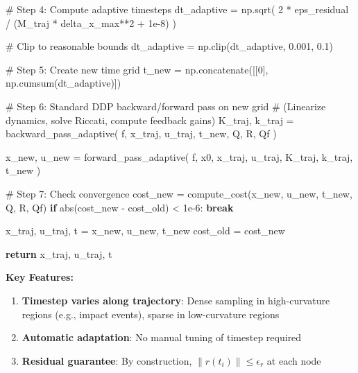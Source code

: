 \documentclass[
  letterpaper,
  DIV=11,
  numbers=noendperiod]{scrartcl}
\newenvironment{Shaded}{\begin{snugshade}}{\end{snugshade}}
\newcommand{\BuiltInTok}[1]{\textcolor[rgb]{0.00,0.23,0.31}{#1}}
\newcommand{\CommentTok}[1]{\textcolor[rgb]{0.37,0.37,0.37}{#1}}
\newcommand{\ControlFlowTok}[1]{\textcolor[rgb]{0.00,0.23,0.31}{\textbf{#1}}}
\newcommand{\DecValTok}[1]{\textcolor[rgb]{0.68,0.00,0.00}{#1}}
\newcommand{\FloatTok}[1]{\textcolor[rgb]{0.68,0.00,0.00}{#1}}
\newcommand{\NormalTok}[1]{\textcolor[rgb]{0.00,0.23,0.31}{#1}}
\newcommand{\OperatorTok}[1]{\textcolor[rgb]{0.37,0.37,0.37}{#1}}
\providecommand{\tightlist}{%
  \setlength{\itemsep}{0pt}\setlength{\parskip}{0pt}}\usepackage{longtable,booktabs,array}
\begin{document}
\begin{Shaded}
\begin{Highlighting}[]
        \CommentTok{\# Step 4: Compute adaptive timesteps}
\NormalTok{        dt\_adaptive }\OperatorTok{=}\NormalTok{ np.sqrt(}
            \DecValTok{2} \OperatorTok{*}\NormalTok{ eps\_residual }\OperatorTok{/}\NormalTok{ (M\_traj }\OperatorTok{*}\NormalTok{ delta\_x\_max}\OperatorTok{**}\DecValTok{2} \OperatorTok{+} \FloatTok{1e{-}8}\NormalTok{)}
\NormalTok{        )}

        \CommentTok{\# Clip to reasonable bounds}
\NormalTok{        dt\_adaptive }\OperatorTok{=}\NormalTok{ np.clip(dt\_adaptive, }\FloatTok{0.001}\NormalTok{, }\FloatTok{0.1}\NormalTok{)}

        \CommentTok{\# Step 5: Create new time grid}
\NormalTok{        t\_new }\OperatorTok{=}\NormalTok{ np.concatenate([[}\DecValTok{0}\NormalTok{], np.cumsum(dt\_adaptive)])}

        \CommentTok{\# Step 6: Standard DDP backward/forward pass on new grid}
        \CommentTok{\# (Linearize dynamics, solve Riccati, compute feedback gains)}
\NormalTok{        K\_traj, k\_traj }\OperatorTok{=}\NormalTok{ backward\_pass\_adaptive(}
\NormalTok{            f, x\_traj, u\_traj, t\_new, Q, R, Qf}
\NormalTok{        )}

\NormalTok{        x\_new, u\_new }\OperatorTok{=}\NormalTok{ forward\_pass\_adaptive(}
\NormalTok{            f, x0, x\_traj, u\_traj, K\_traj, k\_traj, t\_new}
\NormalTok{        )}

        \CommentTok{\# Step 7: Check convergence}
\NormalTok{        cost\_new }\OperatorTok{=}\NormalTok{ compute\_cost(x\_new, u\_new, t\_new, Q, R, Qf)}
        \ControlFlowTok{if} \BuiltInTok{abs}\NormalTok{(cost\_new }\OperatorTok{{-}}\NormalTok{ cost\_old) }\OperatorTok{\textless{}} \FloatTok{1e{-}6}\NormalTok{:}
            \ControlFlowTok{break}

\NormalTok{        x\_traj, u\_traj, t }\OperatorTok{=}\NormalTok{ x\_new, u\_new, t\_new}
\NormalTok{        cost\_old }\OperatorTok{=}\NormalTok{ cost\_new}

    \ControlFlowTok{return}\NormalTok{ x\_traj, u\_traj, t}
\end{Highlighting}
\end{Shaded}

\textbf{Key Features:}

\begin{enumerate}
\def\labelenumi{\arabic{enumi}.}
\tightlist
\item
  \textbf{Timestep varies along trajectory}: Dense sampling in
  high-curvature regions (e.g., impact events), sparse in low-curvature
  regions
\item
  \textbf{Automatic adaptation}: No manual tuning of timestep required
\item
  \textbf{Residual guarantee}: By construction,
  \(\|r(t_i)\| \leq \epsilon_r\) at each node
\end{enumerate}
\end{document}
